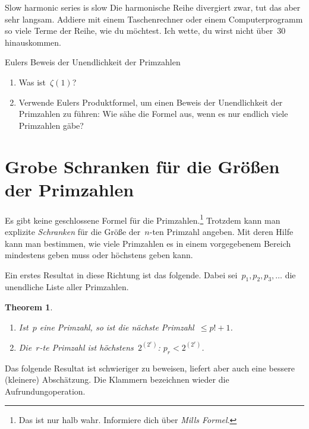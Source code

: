\documentclass[twoside]{../zirkelblatt1415}
\theoremstyle{definition}
\theoremstyle{plain}
\newtheorem{thm}[defn]{Theorem}
\theoremstyle{remark}
\begin{document}
\begin{aufgabe}{Slow harmonic series is slow}
Die harmonische Reihe divergiert zwar, tut das aber sehr langsam. Addiere mit
einem Taschenrechner oder einem Computerprogramm so viele Terme der Reihe, wie
du möchtest. Ich wette, du wirst nicht über~$30$ hinauskommen.
\end{aufgabe}

\begin{aufgabe}{Eulers Beweis der Unendlichkeit der Primzahlen}
\begin{enumerate}
\item Was ist~$\zeta(1)$?
\item Verwende Eulers Produktformel, um einen Beweis der
Unendlichkeit der Primzahlen zu führen: Wie sähe die Formel aus, wenn es nur
endlich viele Primzahlen gäbe?
\end{enumerate}\fixlistspacing
\end{aufgabe}


\section{Grobe Schranken für die Größen der Primzahlen}

Es gibt keine geschlossene Formel für die Primzahlen.\footnote{Das ist nur halb
wahr. Informiere dich über \emph{Mills Formel}.} Trotzdem kann man explizite
\emph{Schranken} für die Größe der~$n$-ten Primzahl angeben. Mit deren Hilfe
kann man bestimmen, wie viele Primzahlen es in einem vorgegebenem Bereich
mindestens geben muss oder höchstens geben kann.

Ein erstes Resultat in diese Richtung ist das folgende. Dabei
sei~$p_1,p_2,p_3,\ldots$ die unendliche Liste aller Primzahlen.

\begin{thm}\label{thm:schranke1}\ \\[-2em]
\begin{enumerate}
\item
Ist~$p$ eine Primzahl, so ist die nächste Primzahl~$\leq p! + 1$. \\[-2em]
\item
Die~$r$-te Primzahl ist höchstens~$2^{(2^r)}$: $p_r < 2^{(2^r)}$.
\end{enumerate}
\end{thm}

Das folgende Resultat ist schwieriger zu beweisen, liefert aber auch eine
bessere (kleinere) Abschätzung. Die Klammern bezeichnen wieder die
Aufrundungoperation.
\end{document}
